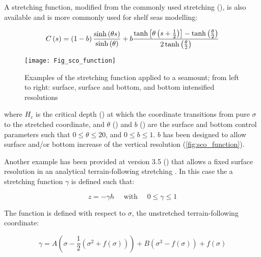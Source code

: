 \documentclass[../tex_main/NEMO_manual]{subfiles}
\begin{document}
A stretching function,
modified from the commonly used \citet{Song_Haidvogel_JCP94} stretching (),
is also available and is more commonly used for shelf seas modelling:

\begin{equation}
  C\left(s\right) =   \left(1 - b \right)\frac{ \sinh\left( \theta s\right)}{\sinh\left(\theta\right)} +      \\
  b\frac{ \tanh \left[ \theta \left(s + \frac{1}{2} \right)\right] - \tanh\left(\frac{\theta}{2}\right)}{ 2\tanh\left (\frac{\theta}{2}\right)}
  \label{eq:SH94_2}
\end{equation}

\begin{figure}[!ht]    \begin{center}
\texttt{[image: Fig\_sco\_function]}
\caption{  \protect\label{fig:sco_function}
  Examples of the stretching function applied to a seamount;
  from left to right: surface, surface and bottom, and bottom intensified resolutions}
\end{center}   \end{figure}

where $H_c$ is the critical depth () at which
the coordinate transitions from pure $\sigma$ to the stretched coordinate,
and $\theta$ () and $b$ () are the surface and bottom control parameters such that
$0\leqslant \theta \leqslant 20$, and $0\leqslant b\leqslant 1$.
$b$ has been designed to allow surface and/or bottom increase of the vertical resolution
(\autoref{fig:sco_function}).

Another example has been provided at version 3.5 () that allows a fixed surface resolution in
an analytical terrain-following stretching \citet{Siddorn_Furner_OM12}.
In this case the a stretching function $\gamma$ is defined such that:

\begin{equation}
z = -\gamma h \quad \text{ with } \quad 0 \leq \gamma \leq 1
\label{eq:z}
\end{equation}

The function is defined with respect to $\sigma$, the unstretched terrain-following coordinate:

\begin{equation} \label{eq:DOM_gamma_deriv}
\gamma= A\left(\sigma-\frac{1}{2}\left(\sigma^{2}+f\left(\sigma\right)\right)\right)+B\left(\sigma^{3}-f\left(\sigma\right)\right)+f\left(\sigma\right)
\end{equation}
\end{document}
